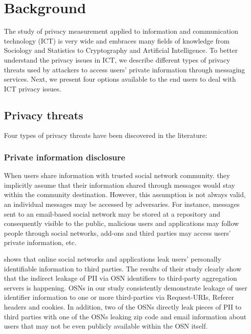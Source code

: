 \section{Background}

The study of privacy measurement applied to information and communication technology (ICT) is very wide and embraces many fields of knowledge
	from Sociology and Statistics to Cryptography and Artificial Intelligence.
To better understand the privacy issues in ICT,
	we describe different types of privacy threats used by attackers to access users' private information through messaging services.
Next,
	we present four options available to the end users to deal with ICT privacy issues.

\subsection{Privacy threats}

Four types of privacy threats have been discovered in the literature:

\subsubsection{Private information disclosure}

When users share information with trusted social network community.
	they implicitly assume that their information shared through messages would stay within the community destination.
However,
	this assumption is not always valid,
	an individual messages may be accessed by adversaries.
For instance,
	messages sent to an email-based social network may be stored at a repository and consequently visible to the public,
	malicious users and applications may follow people through social networks,
	add-ons and third parties may access users’ private information,
	etc.

\cite{krishnamurthy_leakage_2010} shows that online social networks and applications leak users’ personally identifiable information to third parties.
The results of their study clearly show that the indirect leakage of PII via OSN identifiers to third-party aggregation servers is happening.
OSNs in our study consistently demonstrate leakage of user identifier information to one or more third-parties via Request-URIs,
	Referer headers and cookies.
In addition,
	two of the OSNs directly leak pieces of PII to third parties with one of the OSNs leaking zip code and email information about users that may not be even publicly available within the OSN itself.

